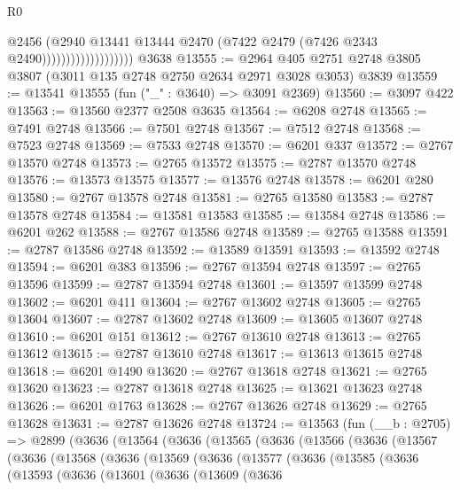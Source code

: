 \begin{lexlean}{R0}
\begin{coremodule}
                                    @2456
                                    (@2940
                                      @13441
                                      @13444
                                      @2470
                                      (@7422 @2479 (@7426 @2343 @2490)))))))))))))))))))
    @3638
@13555 := @2964 @405 @2751 @2748 @3805 @3807 (@3011 @135 @2748 @2750 @2634 @2971 @3028 @3053) @3839
@13559 := @13541 @13555 (fun ("_" : @3640) => @3091 @2369)
@13560 := @3097 @422
@13563 := @13560 @2377 @2508 @3635
@13564 := @6208 @2748
@13565 := @7491 @2748
@13566 := @7501 @2748
@13567 := @7512 @2748
@13568 := @7523 @2748
@13569 := @7533 @2748
@13570 := @6201 @337
@13572 := @2767 @13570 @2748
@13573 := @2765 @13572
@13575 := @2787 @13570 @2748
@13576 := @13573 @13575
@13577 := @13576 @2748
@13578 := @6201 @280
@13580 := @2767 @13578 @2748
@13581 := @2765 @13580
@13583 := @2787 @13578 @2748
@13584 := @13581 @13583
@13585 := @13584 @2748
@13586 := @6201 @262
@13588 := @2767 @13586 @2748
@13589 := @2765 @13588
@13591 := @2787 @13586 @2748
@13592 := @13589 @13591
@13593 := @13592 @2748
@13594 := @6201 @383
@13596 := @2767 @13594 @2748
@13597 := @2765 @13596
@13599 := @2787 @13594 @2748
@13601 := @13597 @13599 @2748
@13602 := @6201 @411
@13604 := @2767 @13602 @2748
@13605 := @2765 @13604
@13607 := @2787 @13602 @2748
@13609 := @13605 @13607 @2748
@13610 := @6201 @151
@13612 := @2767 @13610 @2748
@13613 := @2765 @13612
@13615 := @2787 @13610 @2748
@13617 := @13613 @13615 @2748
@13618 := @6201 @1490
@13620 := @2767 @13618 @2748
@13621 := @2765 @13620
@13623 := @2787 @13618 @2748
@13625 := @13621 @13623 @2748
@13626 := @6201 @1763
@13628 := @2767 @13626 @2748
@13629 := @2765 @13628
@13631 := @2787 @13626 @2748
@13724 := @13563
    (fun (__b : @2705) =>
    @2899
      (@3636
        (@13564
          (@3636
            (@13565
              (@3636
                (@13566
                  (@3636
                    (@13567
                      (@3636
                        (@13568
                          (@3636
                            (@13569
                              (@3636
                                (@13577
                                  (@3636
                                    (@13585
                                      (@3636
                                        (@13593
                                          (@3636
                                            (@13601
                                              (@3636
                                                (@13609
                                                  (@3636

\end{coremodule}
\end{lexlean}
